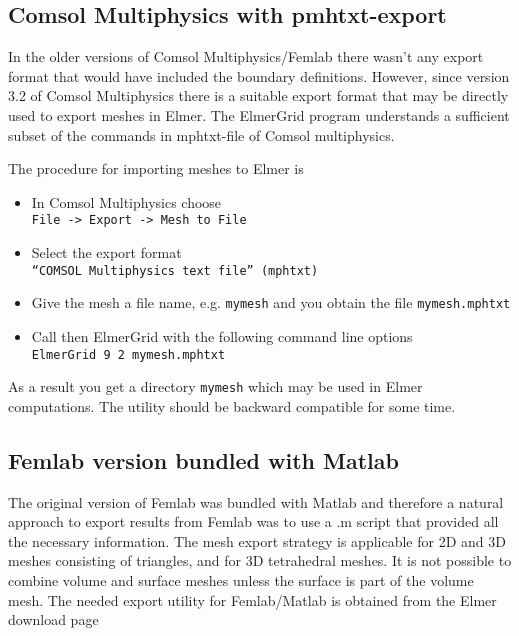 \subsection{Comsol Multiphysics with pmhtxt-export}

In the older versions of Comsol Multiphysics/Femlab there 
wasn't any export format that would have included the boundary definitions. 
However, since version 3.2 of Comsol Multiphysics there 
is a suitable export format that may be directly used to export meshes in Elmer. 
The ElmerGrid program 
understands a sufficient subset of the commands in mphtxt-file of 
Comsol multiphysics. 

The procedure for importing meshes to Elmer is
\begin{itemize}
  \item In Comsol Multiphysics choose \\
   \texttt{File -> Export -> Mesh to File}
   \item Select the export format \\ \texttt{``COMSOL Multiphysics text file'' (mphtxt)}
   \item Give the mesh a file name, e.g. \texttt{mymesh} and you obtain the 
    file \texttt{mymesh.mphtxt}
  \item Call then ElmerGrid with the following command line options \\
    \texttt{ElmerGrid 9 2 mymesh.mphtxt}
\end{itemize}
As a result you get a directory \texttt{mymesh} which may be used in Elmer 
computations. The utility should be backward compatible for some time.


\subsection{Femlab version bundled with Matlab}

The original version of Femlab was bundled with 
Matlab and therefore a natural approach to export results from Femlab was 
to use a .m script that provided all the necessary information. 
The mesh export strategy is applicable for 2D and 3D meshes consisting
of triangles, and for 3D tetrahedral meshes. It is not possible to
combine volume and surface meshes unless the surface is part of the
volume mesh. The needed export utility for Femlab/Matlab is obtained from
the Elmer download page

